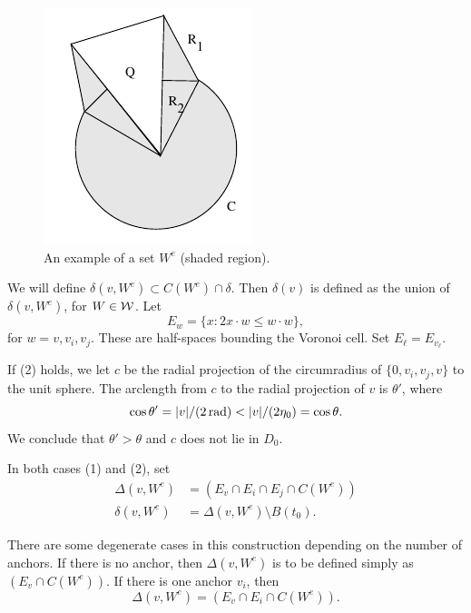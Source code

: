 \begin{figure}[htb]
  \centering
  \includegraphics{PS/diag46.pdf}
  \caption{An example of a set $W^e$ (shaded region).}
  \label{fig:anchor-quarter}
\end{figure}

We will define
    $\delta(v,W^e)\subset C(W^e)\cap \delta$.
Then $\delta(v)$ is defined as the union of $\delta(v,W^e)$, for
$W\in{\mathcal W}$. Let
    $$E_w = \{x : 2 x\cdot w \le w\cdot w\},$$
for $w = v,v_i,v_j$. These are half-spaces bounding the Voronoi
cell. Set $E_\ell = E_{v_\ell}$.

If (2) holds, we let $c$ be the radial projection of the
circumradius of $\{0,v_i,v_j,v\}$ to the unit sphere.  The arclength
from $c$ to the radial projection of $v$ is $\theta'$, where
$$\cos\theta' = |v|/(2\rad)<|v|/(2\eta_0) = \cos\theta.$$
We conclude that $\theta'>\theta$ and $c$ does not lie in $D_0$.

\begin{definition} \label{def:delta-e}
In both cases (1) and (2), set
    $$
    \begin{array}{lll}
    \Delta(v,W^e) &= (E_v\cap E_i\cap E_j \cap C(W^e))\\
    \delta(v,W^e) &= \Delta(v,W^e)\setminus B(t_0).
    \end{array}
    $$
\end{definition}

\begin{remark}
There are some degenerate cases in this construction depending on
the number of anchors.  If there is no anchor, then
$\Delta(v,W^e)$ is to be defined simply as $(E_v \cap C(W^e))$.
If there is one anchor $v_i$, then
    $$
    \Delta(v,W^e) = (E_v\cap E_i\cap C(W^e)).
    $$
\end{remark}

